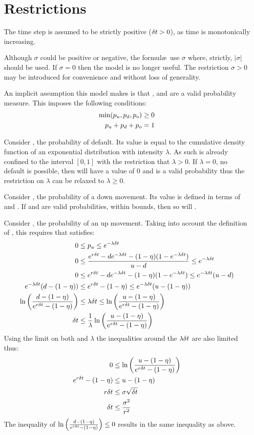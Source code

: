 \documentclass[a4paper,11pt,oneside]{report}
\theoremstyle{plain}
\theoremstyle{definition}
\begin{document}

\section{Restrictions}
The time step \Dt is assumed to be strictly positive ($\delta t > 0$), as time is monotonically increasing.

Although $\sigma$ could be positive or negative, the formul\ae\ use $\sigma$ where, strictly, $|\sigma|$ should be used.  If $\sigma = 0$ then the model is no longer useful.  The restriction $\sigma > 0$ may be introduced for convenience and without loss of generality.

An implicit assumption this model makes is that \pu, \pd and \po are a valid probability measure.  This imposes the following conditions:
\begin{align}
 \min(p_u, p_d, p_o) &\ge 0 \\
 p_u + p_d + p_o &= 1 \label{eq:bin_prob_limit}
\end{align}

Consider \po, the probability of default.  Its value is equal to the cumulative density function of an exponential distribution with intensity $\lambda$.  As such \po is already confined to the interval $[0, 1]$ with the restriction that $\lambda > 0$.  If $\lambda = 0$, no default is possible, then \po will have a value of 0 and is a valid probability thus the restriction on $\lambda$ can be relaxed to $\lambda \ge 0$.

Consider \pd, the probability of a down movement.  Its value is defined in terms of \pu and \po.  If \pu and \po are valid probabilities, within bounds, then so will \pd.

Consider \pu, the probability of an up movement.  Taking into account the definition of \pd, this requires that \pu satisfies:
\begin{align}
 0 &\le p_u \le e^{-\lambda \delta t} \\
 0 &\le \frac{e^{r\delta t} - d e^{-\lambda\delta t} - (1 - \eta)(1 - e^{-\lambda\delta t})}{u - d} \le e^{-\lambda \delta t} \nonumber\\
 0 &\le e^{r\delta t} - d e^{-\lambda\delta t} - (1 - \eta)(1 - e^{-\lambda\delta t}) \le e^{-\lambda \delta t}(u - d) \nonumber\\
 e^{-\lambda\delta t}(d - (1 - \eta)) &\le e^{r\delta t} - (1 - \eta) \le e^{-\lambda\delta t}(u - (1 - \eta)) \nonumber\\
 \ln\left(\frac{d - (1 - \eta)}{e^{r\delta t} - (1 - \eta)}\right) &\le \lambda\delta t \le \ln\left(\frac{u - (1 - \eta)}{e^{r\delta t} - (1 - \eta)}\right) \\
 \delta t &\le \frac{1}{\lambda}\ln\left(\frac{u - (1 - \eta)}{e^{r\delta t} - (1 - \eta)}\right)
\end{align}
Using the limit on both \Dt and $\lambda$ the inequalities around the $\lambda\delta t$ are also limited thus:
\begin{align}
 0 &\le \ln\left(\frac{u - (1 - \eta)}{e^{r\delta t} - (1 - \eta)}\right) \nonumber\\
 e^{r\delta t} - (1 - \eta) &\le u - (1 - \eta) \nonumber\\
 r\delta t &\le \sigma \sqrt{\delta t} \nonumber\\
 \delta t &\le \frac{\sigma^2}{r^2}
\end{align}
The inequality of $\ln\left(\frac{d - (1 - \eta)}{e^{r\delta t} - (1 - \eta)}\right) \le 0$ results in the same inequality as above.
\end{document}

